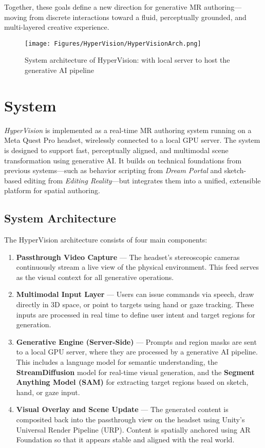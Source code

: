 Together, these goals define a new direction for generative MR authoring—moving from discrete interactions toward a fluid, perceptually grounded, and multi-layered creative experience.



\begin{figure*}[h]
    \centering
    \texttt{[image: Figures/HyperVision/HyperVisionArch.png]}
    \caption{System architecture of HyperVision: with local server to host the generative AI pipeline}
    \label{fig:Arch}
\end{figure*}
\section{System}

\textit{HyperVision} is implemented as a real-time MR authoring system running on a Meta Quest Pro headset, wirelessly connected to a local GPU server. The system is designed to support fast, perceptually aligned, and multimodal scene transformation using generative AI. It builds on technical foundations from previous systems—such as behavior scripting from \textit{Dream Portal} and sketch-based editing from \textit{Editing Reality}—but integrates them into a unified, extensible platform for spatial authoring.

\subsection{System Architecture}

The HyperVision architecture consists of four main components:

\begin{enumerate}
    \item \textbf{Passthrough Video Capture} — The headset’s stereoscopic cameras continuously stream a live view of the physical environment. This feed serves as the visual context for all generative operations.

    \item \textbf{Multimodal Input Layer} — Users can issue commands via speech, draw directly in 3D space, or point to targets using hand or gaze tracking. These inputs are processed in real time to define user intent and target regions for generation.

    \item \textbf{Generative Engine (Server-Side)} — Prompts and region masks are sent to a local GPU server, where they are processed by a generative AI pipeline. This includes a language model for semantic understanding, the \textbf{StreamDiffusion} model for real-time visual generation, and the \textbf{Segment Anything Model (SAM)} for extracting target regions based on sketch, hand, or gaze input.

    \item \textbf{Visual Overlay and Scene Update} — The generated content is composited back into the passthrough view on the headset using Unity’s Universal Render Pipeline (URP). Content is spatially anchored using AR Foundation so that it appears stable and aligned with the real world.
\end{enumerate}

